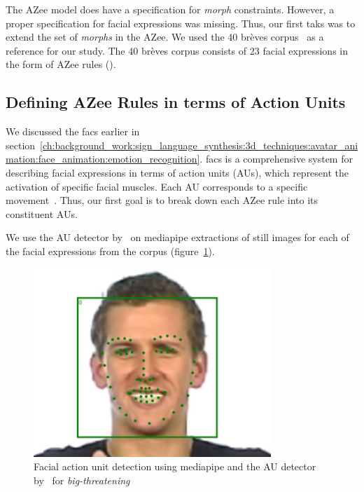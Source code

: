 \documentclass[../../main]{subfiles}
\begin{document}
The AZee model does have a specification for \emph{morph} constraints. However, a proper specification for facial expressions was missing. Thus, our first taks was to extend the set of \emph{morphs} in the AZee. We used the 40 brèves corpus~\cite{challant2024extending, challant2022first} as a reference for our study. The 40 brèves corpus consists of 23 facial expressions in the form of AZee rules ().

\subsection{Defining AZee Rules in terms of Action Units}
\label{ch:facial_expressions:defining_azee_rules_in_terms_of_action_units}

We discussed the \gls{facs} earlier in section~\ref{ch:background_work:sign_language_synthesis:3d_techniques:avatar_animation:face_animation:emotion_recognition}. \gls{facs} is a comprehensive system for describing facial expressions in terms of action units (AUs), which represent the activation of specific facial muscles. Each AU corresponds to a specific movement~. Thus, our first goal is to break down each AZee rule into its constituent AUs. 

We use the AU detector by~\cite{luo2022learning} on mediapipe extractions of still images for each of the facial expressions from the corpus (figure~\ref{ch:facial_expressions:fig:face_detect}).

\begin{figure}
    \centering
    \includegraphics[width=0.8\textwidth]{chapters/facial_expressions/images/face_detect.png}
    \caption{Facial action unit detection using mediapipe and the AU detector by~\cite{luo2022learning} for \emph{big-threatening}}
    \label{ch:facial_expressions:fig:face_detect}
\end{figure}
\end{document}
